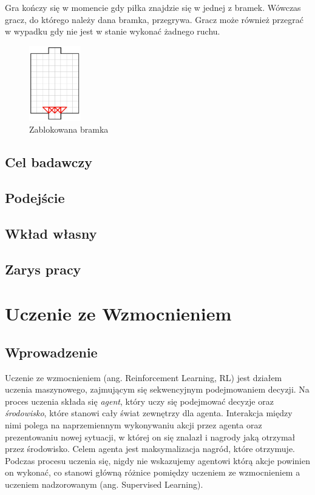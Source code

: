 \documentclass[licencjacka]{pracamgr}
\begin{document}
Gra kończy się w momencie gdy piłka znajdzie się w jednej z bramek.
Wówczas gracz, do którego należy dana bramka, przegrywa. 
Gracz może również przegrać w wypadku gdy nie jest w stanie wykonać żadnego ruchu.


\begin{figure}[ht]
  \centering
  \includegraphics[width=0.2\textwidth]{zablokowanie}
  \caption{Zablokowana bramka}
\end{figure}
 
\section{Cel badawczy} 
 
\section{Podejście} 

\section{Wkład własny}

\section{Zarys pracy}
 
\chapter{Uczenie ze Wzmocnieniem}\label{r:rl}

\section{Wprowadzenie}

Uczenie ze wzmocnieniem (ang. Reinforcement Learning, RL) jest działem uczenia maszynowego, zajmującym się sekwencyjnym podejmowaniem decyzji. Na proces uczenia składa się \emph{agent}, który uczy się podejmować decyzje oraz \emph{środowisko}, które stanowi cały świat zewnętrzy dla agenta. Interakcja między nimi polega na naprzemiennym wykonywaniu akcji przez agenta oraz prezentowaniu nowej sytuacji, w której on się znalazł i nagrody jaką otrzymał przez środowisko. Celem agenta jest maksymalizacja nagród, które otrzymuje.
Podczas procesu uczenia się, nigdy nie wskazujemy agentowi którą akcje powinien on wykonać, co stanowi główną różnice pomiędzy uczeniem ze wzmocnieniem a uczeniem nadzorowanym (ang. Supervised Learning). 
\end{document}
